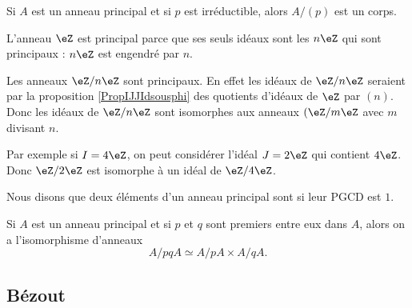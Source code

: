 \begin{proposition}     \label{PropoTMMXCx}
    Si \( A\) est un anneau principal et si \( p\) est irréductible, alors \(  A/ (p) \) est un corps.
\end{proposition}

\begin{example}
    L'anneau \( \eZ\) est principal parce que ses seuls idéaux sont les \( n\eZ\) qui sont principaux : \( n\eZ\) est engendré par \( n\).
\end{example}

\begin{example}
    Les anneaux \( \eZ/n\eZ\) sont principaux. En effet les idéaux de \( \eZ/n\eZ\) seraient par la proposition \ref{PropIJJIdsousphi} des quotients d'idéaux de \( \eZ\) par \( (n)\). Donc les idéaux de \( \eZ/n\eZ\) sont isomorphes aux anneaux \( (\eZ/m\eZ\) avec \( m\) divisant \( n\).

    Par exemple si \( I=4\eZ\), on peut considérer l'idéal \( J=2\eZ\) qui contient \( 4\eZ\). Donc \( \eZ/2\eZ\) est isomorphe à un idéal de \( \eZ/4\eZ\).
\end{example}

\begin{definition}
Nous disons que deux éléments d'un anneau principal sont  si leur PGCD est \( 1\).
\end{definition}

\begin{theorem}        \label{ThofPXwiM}
    Si \( A\) est un anneau principal et si \( p\) et \( q\) sont premiers entre eux dans \( A\), alors on a l'isomorphisme d'anneaux
    \begin{equation}
        A/pqA\simeq A/pA\times A/qA.
    \end{equation}
\end{theorem}

\subsection{Bézout}

